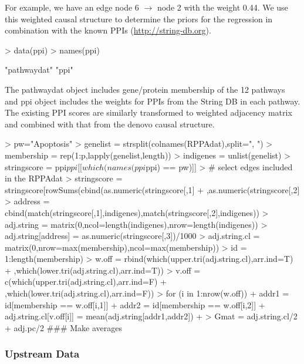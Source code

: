 \documentclass{article}
\begin{document}
For example, we have an edge node 6 $\rightarrow$ node 2 with the weight 0.44. We use this weighted causal structure to determine the priors for the regression in combination with the known PPIs (\url{http://string-db.org}).
\begin{Schunk}
\begin{Sinput}
> data(ppi)
> names(ppi)
\end{Sinput}
\begin{Soutput}
[1] "pathwaydat" "ppi"       
\end{Soutput}
\end{Schunk}
The pathwaydat object includes gene/protein membership of the 12 pathways and ppi object includes the weights for PPIs from the String DB in each pathway. The existing PPI scores are similarly transformed to weighted adjacency matrix and combined with that from the denovo causal structure. 
\begin{Schunk}
\begin{Sinput}
> pw="Apoptosis"
> genelist = strsplit(colnames(RPPAdat),split=", ")
> membership = rep(1:p,lapply(genelist,length))
> indigenes = unlist(genelist)
> stringscore = ppi$ppi[[which(names(ppi$ppi) == pw)]]
> # select edges included in the RPPAdat
> stringscore = stringscore[rowSums(cbind(as.numeric(stringscore[,1] %in% indigenes)
+                     ,as.numeric(stringscore[,2] %in% indigenes))) == 2,]
> address = cbind(match(stringscore[,1],indigenes),match(stringscore[,2],indigenes))
> adj.string = matrix(0,ncol=length(indigenes),nrow=length(indigenes))
> adj.string[address] = as.numeric(stringscore[,3])/1000
> adj.string.cl = matrix(0,nrow=max(membership),ncol=max(membership))
> id = 1:length(membership)
> w.off = rbind(which(upper.tri(adj.string.cl),arr.ind=T)
+               ,which(lower.tri(adj.string.cl),arr.ind=T))
> v.off = c(which(upper.tri(adj.string.cl),arr.ind=F)
+           ,which(lower.tri(adj.string.cl),arr.ind=F))
> for (i in 1:nrow(w.off)) {
+   addr1 = id[membership == w.off[i,1]]
+   addr2 = id[membership == w.off[i,2]]
+   adj.string.cl[v.off[i]] = mean(adj.string[addr1,addr2])
+ }
> Gmat = adj.string.cl/2 + adj.pc/2 ### Make averages 
\end{Sinput}
\end{Schunk}
\subsubsection{Upstream Data}
\end{document}
